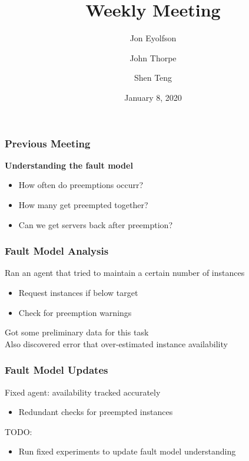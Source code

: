 
\title{Weekly Meeting}
\date{January 8, 2020}
\author{Jon Eyolfson \and John Thorpe \and Shen Teng}



  \begin{frame}[plain]
    \titlepage
  \end{frame}

  \setcounter{framenumber}{0}

  \begin{frame}
    \frametitle{Previous Meeting}
    \textbf{Understanding the fault model}
    \begin{itemize}
      \item How often do preemptions occurr?
      \item How many get preempted together?
      \item Can we get servers back after preemption?
    \end{itemize}

  \end{frame}

  \begin{frame}
    \frametitle{Fault Model Analysis}

    Ran an agent that tried to maintain a certain number of instances \\
    \begin{itemize}
      \item Request instances if below target
      \item Check for preemption warnings
    \end{itemize}

    \vspace{1em}
    Got some preliminary data for this task \\
    Also discovered error that over-estimated instance availability
  \end{frame}

  \begin{frame}
    \frametitle{Fault Model Updates}

    Fixed agent: availability tracked accurately
    \begin{itemize}
      \item Redundant checks for preempted instances
    \end{itemize}

    \vspace{1em}
    TODO:
    \begin{itemize}
      \item Run fixed experiments to update fault model understanding
    \end{itemize}
  \end{frame}


